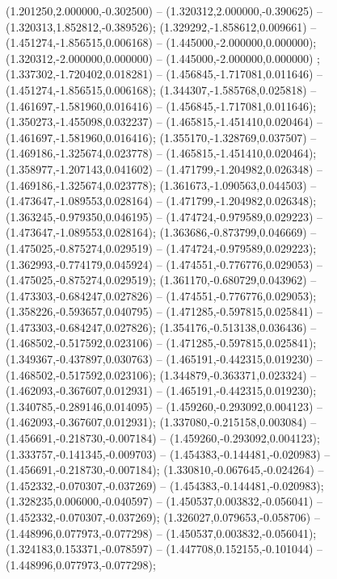  (1.201250,2.000000,-0.302500) -- (1.320312,2.000000,-0.390625) -- (1.320313,1.852812,-0.389526);
 (1.329292,-1.858612,0.009661) -- (1.451274,-1.856515,0.006168) -- (1.445000,-2.000000,0.000000);
 (1.320312,-2.000000,0.000000) -- (1.445000,-2.000000,0.000000) ;
 (1.337302,-1.720402,0.018281) -- (1.456845,-1.717081,0.011646) -- (1.451274,-1.856515,0.006168);
 (1.344307,-1.585768,0.025818) -- (1.461697,-1.581960,0.016416) -- (1.456845,-1.717081,0.011646);
 (1.350273,-1.455098,0.032237) -- (1.465815,-1.451410,0.020464) -- (1.461697,-1.581960,0.016416);
 (1.355170,-1.328769,0.037507) -- (1.469186,-1.325674,0.023778) -- (1.465815,-1.451410,0.020464);
 (1.358977,-1.207143,0.041602) -- (1.471799,-1.204982,0.026348) -- (1.469186,-1.325674,0.023778);
 (1.361673,-1.090563,0.044503) -- (1.473647,-1.089553,0.028164) -- (1.471799,-1.204982,0.026348);
 (1.363245,-0.979350,0.046195) -- (1.474724,-0.979589,0.029223) -- (1.473647,-1.089553,0.028164);
 (1.363686,-0.873799,0.046669) -- (1.475025,-0.875274,0.029519) -- (1.474724,-0.979589,0.029223);
 (1.362993,-0.774179,0.045924) -- (1.474551,-0.776776,0.029053) -- (1.475025,-0.875274,0.029519);
 (1.361170,-0.680729,0.043962) -- (1.473303,-0.684247,0.027826) -- (1.474551,-0.776776,0.029053);
 (1.358226,-0.593657,0.040795) -- (1.471285,-0.597815,0.025841) -- (1.473303,-0.684247,0.027826);
 (1.354176,-0.513138,0.036436) -- (1.468502,-0.517592,0.023106) -- (1.471285,-0.597815,0.025841);
 (1.349367,-0.437897,0.030763) -- (1.465191,-0.442315,0.019230) -- (1.468502,-0.517592,0.023106);
 (1.344879,-0.363371,0.023324) -- (1.462093,-0.367607,0.012931) -- (1.465191,-0.442315,0.019230);
 (1.340785,-0.289146,0.014095) -- (1.459260,-0.293092,0.004123) -- (1.462093,-0.367607,0.012931);
 (1.337080,-0.215158,0.003084) -- (1.456691,-0.218730,-0.007184) -- (1.459260,-0.293092,0.004123);
 (1.333757,-0.141345,-0.009703) -- (1.454383,-0.144481,-0.020983) -- (1.456691,-0.218730,-0.007184);
 (1.330810,-0.067645,-0.024264) -- (1.452332,-0.070307,-0.037269) -- (1.454383,-0.144481,-0.020983);
 (1.328235,0.006000,-0.040597) -- (1.450537,0.003832,-0.056041) -- (1.452332,-0.070307,-0.037269);
 (1.326027,0.079653,-0.058706) -- (1.448996,0.077973,-0.077298) -- (1.450537,0.003832,-0.056041);
 (1.324183,0.153371,-0.078597) -- (1.447708,0.152155,-0.101044) -- (1.448996,0.077973,-0.077298);
